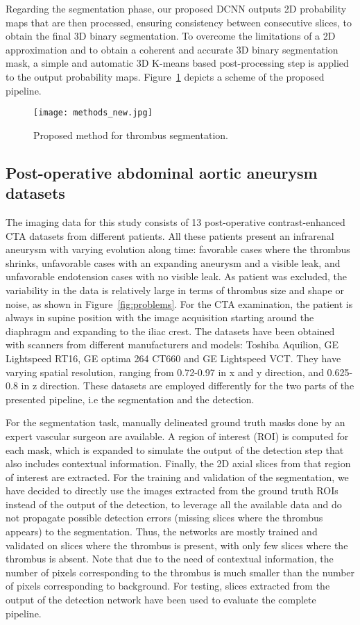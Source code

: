 \documentclass[preprint,authoryear,12pt]{elsarticle}
\begin{document}
Regarding the segmentation phase, our proposed DCNN outputs 2D probability maps that are then processed, ensuring consistency between consecutive slices, to obtain the final 3D binary segmentation. To overcome the limitations of a 2D approximation and to obtain a coherent and accurate 3D binary segmentation mask, a simple and automatic 3D K-means based post-processing step is applied to the output probability maps. Figure~\ref{fig:method} depicts a scheme of the proposed pipeline.

\begin{figure}
\centering
\texttt{[image: methods\_new.jpg]}
\caption{\label{fig:method}Proposed method for thrombus segmentation.}
\end{figure}

\subsection{Post-operative abdominal aortic aneurysm datasets}
\label{subsec:data}
The imaging data for this study consists of 13 post-operative contrast-enhanced CTA datasets from different patients. All these patients present an infrarenal aneurysm with varying evolution along time: favorable cases where the thrombus shrinks, unfavorable cases with an expanding aneurysm and a visible leak, and unfavorable endotension cases with no visible leak. As patient was excluded, the variability in the data is relatively large in terms of thrombus size and shape or noise, as shown in Figure~\ref{fig:problems}. For the CTA examination, the patient is always in supine position with the image acquisition starting around the diaphragm and expanding to the iliac crest. The datasets have been obtained with scanners from different manufacturers and models: Toshiba Aquilion, GE Lightspeed RT16, GE optima 264 CT660 and GE Lightspeed VCT. They have varying spatial resolution, ranging from 0.72-0.97 in x and y direction, and 0.625-0.8 in z direction. These datasets are employed differently for the two parts of the presented pipeline, i.e the segmentation and the detection.

For the segmentation task, manually delineated ground truth masks done by an expert vascular surgeon are available. A region of interest (ROI) is computed for each mask, which is expanded to simulate the output of the detection step that also includes contextual information. Finally, the 2D axial slices from that region of interest are extracted. 
For the training and validation of the segmentation, we have decided to directly use the images extracted from the ground truth ROIs instead of the output of the detection, to leverage all the available data and do not propagate possible detection errors (missing slices where the thrombus appears) to the segmentation. Thus, the networks are mostly trained and validated on slices where the thrombus is present, with only few slices where the thrombus is absent. Note that due to the need of contextual information, the number of pixels corresponding to the thrombus is much smaller than the number of pixels corresponding to background. For testing, slices extracted from the output of the detection network have been used to evaluate the complete pipeline.
\end{document}
